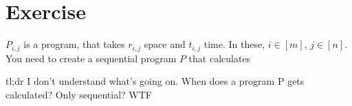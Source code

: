 \section{Exercise}
$P_{i,j}$ is a program, that takes $r_{i,j}$ space and $t_{i,j}$ time. In these, $i \in [m]$, $j \in [n]$.
You need to create a sequential program $P$ that calculates 

tl;dr I don't understand what's going on. When does a program P gets calculated? Only sequential? WTF

\begin{comment}
    
\begin{enumerate}
    \item \done
    \item \done
    \item \done
    \item \done
    \item \neverdone
\end{enumerate}

\subsection{Model}
\subsubsection*{Parameters}
\begin{itemize}
    \item 
\end{itemize}
\subsubsection*{Decision Variables}
\begin{itemize}
    \item 
\end{itemize}
\subsubsection*{Constraints}
\begin{itemize}
    \item 
\end{itemize}
\subsubsection*{Objective Function}
\begin{itemize}
    \item 
\end{itemize}
\subsection{Sources}
Solution in 

\end{comment}
